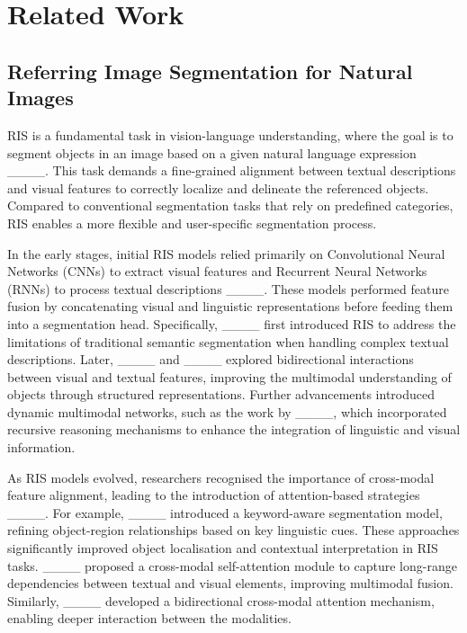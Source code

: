\section{Related Work}
\label{sec:2}

\subsection{Referring Image Segmentation for Natural Images}
\label{sec:2.1}
RIS is a fundamental task in vision-language understanding, where the goal is to segment objects in an image based on a given natural language expression ____. This task demands a fine-grained alignment between textual descriptions and visual features to correctly localize and delineate the referenced objects. Compared to conventional segmentation tasks that rely on predefined categories, RIS enables a more flexible and user-specific segmentation process.

In the early stages, initial RIS models relied primarily on Convolutional Neural Networks (CNNs) to extract visual features and Recurrent Neural Networks (RNNs) to process textual descriptions ____. These models performed feature fusion by concatenating visual and linguistic representations before feeding them into a segmentation head. Specifically, ____ first introduced RIS to address the limitations of traditional semantic segmentation when handling complex textual descriptions. Later, ____ and  ____ explored bidirectional interactions between visual and textual features, improving the multimodal understanding of objects through structured representations. Further advancements introduced dynamic multimodal networks, such as the work by ____, which incorporated recursive reasoning mechanisms to enhance the integration of linguistic and visual information.

As RIS models evolved, researchers recognised the importance of cross-modal feature alignment, leading to the introduction of attention-based strategies ____. For example, ____ introduced a keyword-aware segmentation model, refining object-region relationships based on key linguistic cues. These approaches significantly improved object localisation and contextual interpretation in RIS tasks.  ____ proposed a cross-modal self-attention module to capture long-range dependencies between textual and visual elements, improving multimodal fusion. Similarly, ____ developed a bidirectional cross-modal attention mechanism, enabling deeper interaction between the modalities.

